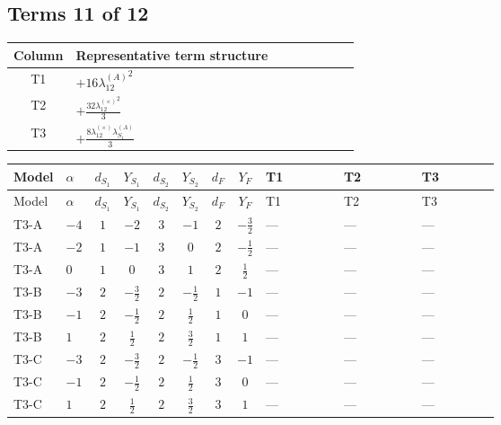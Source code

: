 \documentclass[8pt]{article}
\begin{document}
\begin{landscape}
\subsection*{Terms 11 of 12}
\begin{center}
\begin{tabular}{@{}c >{\raggedright\arraybackslash}p{0.82\linewidth}@{}}
\toprule
Column & Representative term structure \\
\midrule
T1 & \(\displaystyle +16 {\lambda_{12}^{(A)}}^2\) \\
\midrule
T2 & \(\displaystyle +\frac{32 {\lambda_{12}^{(\times)}}^2}{3}\) \\
\midrule
T3 & \(\displaystyle +\frac{8 {\lambda_{12}^{(\times)}} {\lambda_{S_1}^{(A)}}}{3}\) \\
\midrule
\bottomrule
\end{tabular}
\end{center}
\smallskip
\tiny
\begin{longtable}{@{}llcccccc >{\raggedright\arraybackslash}p{0.21\linewidth} >{\raggedright\arraybackslash}p{0.21\linewidth} >{\raggedright\arraybackslash}p{0.21\linewidth}@{}}
\toprule
Model & $\alpha$ & $d_{S_1}$ & $Y_{S_1}$ & $d_{S_2}$ & $Y_{S_2}$ & $d_F$ & $Y_F$ & T1 & T2 & T3 \\
\midrule
\endfirsthead
\toprule
Model & $\alpha$ & $d_{S_1}$ & $Y_{S_1}$ & $d_{S_2}$ & $Y_{S_2}$ & $d_F$ & $Y_F$ & T1 & T2 & T3 \\
\midrule
\endhead
T3-A & $-4$ & $1$ & $-2$ & $3$ & $-1$ & $2$ & $-\frac{3}{2}$ & --- & --- & --- \\
\midrule
T3-A & $-2$ & $1$ & $-1$ & $3$ & $0$ & $2$ & $-\frac{1}{2}$ & --- & --- & --- \\
\midrule
T3-A & $0$ & $1$ & $0$ & $3$ & $1$ & $2$ & $\frac{1}{2}$ & --- & --- & --- \\
\midrule
T3-B & $-3$ & $2$ & $-\frac{3}{2}$ & $2$ & $-\frac{1}{2}$ & $1$ & $-1$ & --- & --- & --- \\
\midrule
T3-B & $-1$ & $2$ & $-\frac{1}{2}$ & $2$ & $\frac{1}{2}$ & $1$ & $0$ & --- & --- & --- \\
\midrule
T3-B & $1$ & $2$ & $\frac{1}{2}$ & $2$ & $\frac{3}{2}$ & $1$ & $1$ & --- & --- & --- \\
\midrule
T3-C & $-3$ & $2$ & $-\frac{3}{2}$ & $2$ & $-\frac{1}{2}$ & $3$ & $-1$ & --- & --- & --- \\
\midrule
T3-C & $-1$ & $2$ & $-\frac{1}{2}$ & $2$ & $\frac{1}{2}$ & $3$ & $0$ & --- & --- & --- \\
\midrule
T3-C & $1$ & $2$ & $\frac{1}{2}$ & $2$ & $\frac{3}{2}$ & $3$ & $1$ & --- & --- & --- \\

\end{longtable}
\end{landscape}
\end{document}
